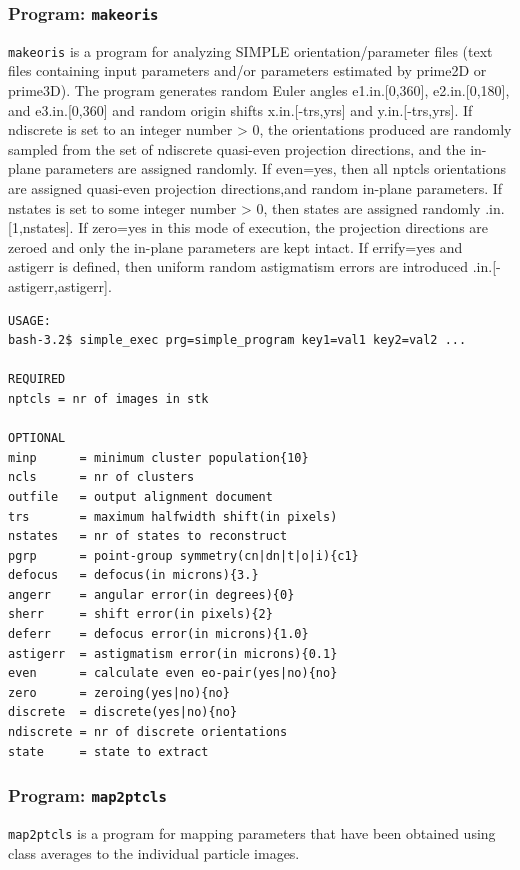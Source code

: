 \documentclass[a4paper,11pt]{article}
\newcommand{\prgname}[1]{\textcolor{NavyBlue}{\texttt{#1}}}
\begin{document}
\subsubsection{Program: \prgname{makeoris}}
\label{makeoris}
\prgname{makeoris} is a program for analyzing SIMPLE orientation/parameter files (text files containing input parameters and/or parameters estimated by prime2D or prime3D). The program generates random Euler angles e1.in.[0,360], e2.in.[0,180], and e3.in.[0,360] and random origin shifts x.in.[-trs,yrs] and y.in.[-trs,yrs]. If ndiscrete is set to an integer number > 0, the orientations produced are randomly sampled from the set of ndiscrete quasi-even projection directions, and the in-plane parameters are assigned randomly. If even=yes, then all nptcls orientations are assigned quasi-even projection directions,and random in-plane parameters. If nstates is set to some integer number > 0, then states are assigned randomly .in.[1,nstates]. If zero=yes in this mode of execution, the projection directions are zeroed and only the in-plane parameters are kept intact. If errify=yes and astigerr is defined, then uniform random astigmatism errors are introduced .in.[-astigerr,astigerr].

\begin{verbatim}
USAGE:
bash-3.2$ simple_exec prg=simple_program key1=val1 key2=val2 ...

REQUIRED
nptcls = nr of images in stk

OPTIONAL
minp      = minimum cluster population{10}
ncls      = nr of clusters
outfile   = output alignment document
trs       = maximum halfwidth shift(in pixels)
nstates   = nr of states to reconstruct
pgrp      = point-group symmetry(cn|dn|t|o|i){c1}
defocus   = defocus(in microns){3.}
angerr    = angular error(in degrees){0}
sherr     = shift error(in pixels){2}
deferr    = defocus error(in microns){1.0}
astigerr  = astigmatism error(in microns){0.1}
even      = calculate even eo-pair(yes|no){no}
zero      = zeroing(yes|no){no}
discrete  = discrete(yes|no){no}
ndiscrete = nr of discrete orientations
state     = state to extract
\end{verbatim}

\subsubsection{Program: \prgname{map2ptcls}}
\label{map2ptcls}
\prgname{map2ptcls} is a program for mapping parameters that have been obtained using class averages to the individual particle images.
\end{document}
